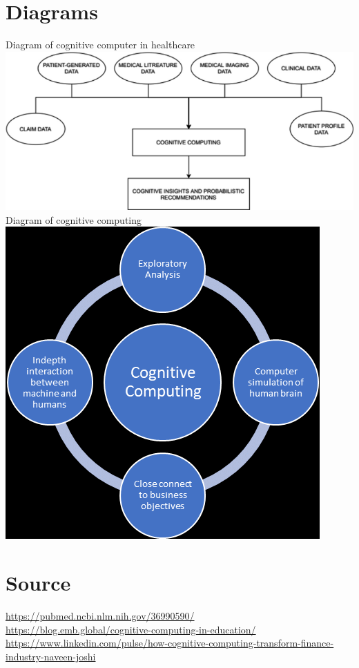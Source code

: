\documentclass{article}
\begin{document}
\section{Diagrams}
Diagram of cognitive computer in healthcare \\
\includegraphics[scale=0.5]{Healthcare} \\
Diagram of cognitive computing \\
\includegraphics[scale=0.5]{Cognitive} \\

\break
\section{Source}
\href{Healthcare}{https://pubmed.ncbi.nlm.nih.gov/36990590/} \\
\href{Education}{https://blog.emb.global/cognitive-computing-in-education/} \\
\href{Finance}{https://www.linkedin.com/pulse/how-cognitive-computing-transform-finance-industry-naveen-joshi} \\
\end{document}
